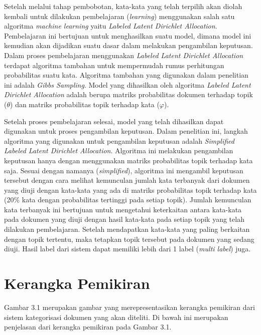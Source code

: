 \indent
Setelah melalui tahap pembobotan, kata-kata yang telah terpilih akan diolah kembali untuk dilakukan pembelajaran ({\itshape learning}) menggunakan salah satu algoritma {\itshape machine learning} yaitu {\itshape Labeled Latent Dirichlet Allocation}. Pembelajaran ini bertujuan untuk menghasilkan suatu model, dimana model ini kemudian akan dijadikan suatu dasar dalam melakukan pengambilan keputusan. Dalam proses pembelajaran menggunakan {\itshape Labeled Latent Dirichlet Allocation} terdapat algoritma tambahan untuk mempermudah rumus perhitungan probabilitas suatu kata. Algoritma tambahan yang digunakan dalam penelitian ini adalah {\itshape Gibbs Sampling}. Model yang dihasilkan oleh algoritma {\itshape Labeled Latent Dirichlet Allocation} adalah berupa matriks probabilitas dokumen terhadap topik ($\theta$) dan matriks probabilitas topik terhadap kata ($\varphi$).

\indent
Setelah proses pembelajaran selesai, model yang telah dihasilkan dapat digunakan untuk proses pengambilan keputusan. Dalam penelitian ini, langkah algoritma yang digunakan untuk pengambilan keputusan adalah {\itshape Simplified Labeled Latent Dirichlet Allocation}. Algoritma ini melakukan pengambilan keputusan hanya dengan menggunakan matriks probabilitas topik terhadap kata saja. Sesuai dengan namanya ({\itshape simplified}), algoritma ini mengambil keputusan tersebut dengan cara melihat kemunculan jumlah kata terbanyak dari dokumen yang diuji dengan kata-kata yang ada di matriks probabilitas topik terhadap kata (20\% kata dengan probabilitas tertinggi pada setiap topik). Jumlah kemunculan kata terbanyak ini bertujuan untuk mengetahui keterkaitan antara kata-kata pada dokumen yang diuji dengan hasil kata-kata pada setiap topik yang telah dilakukan pembelajaran. Setelah mendapatkan kata-kata yang paling berkaitan dengan topik tertentu, maka tetapkan topik tersebut pada dokumen yang sedang diuji. Hasil label dari sistem dapat memiliki lebih dari 1 label ({\itshape multi label}) juga.

\section{Kerangka Pemikiran}
\indent
Gambar 3.1 merupakan gambar yang merepresentasikan kerangka pemikiran dari sistem kategorisasi dokumen yang akan diteliti. Di bawah ini merupakan penjelasan dari kerangka pemikiran pada Gambar 3.1.

